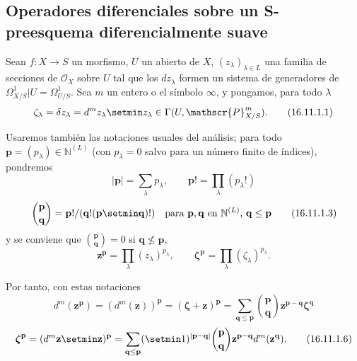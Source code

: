 \subsection{Operadores diferenciales sobre un S-preesquema diferencialmente suave}
\label{IV.16.11}

\begin{env}[16.11.1]
\label{IV.16.11.1}
Sean $f:X\to S$ un morfismo, $U$ un abierto de $X$,
$(z_\lambda)_{\lambda\in L}$ una familia de secciones de $\mathcal{O}_X$
sobre $U$ tal que los $dz_\lambda$ formen un sistema de generadores
de $\varOmega_{X/S}^1|U=\varOmega_{U/S}^1$. Sea $m$ un entero o el símbolo
$\infty$, y pongamos, para todo $\lambda$
\[
  \zeta_\lambda=\delta z_\lambda=d^m z_\lambda\setmin z_\lambda
  \in\Gamma(U,\mathscr{P}_{X/S}^m).
  \tag{16.11.1.1}
  \label{IV.16.11.1.1}
\]

Usaremos también las notaciones usuales del análisis; para todo
$\mathbf{p}=(p_\lambda)\in\mathbb{N}^{(L)}$ (con $p_\lambda=0$ salvo para un
número finito de índices), pondremos
\[
  |\mathbf{p}|=\sum_\lambda p_\lambda,
  \qquad \mathbf{p}!=\prod_\lambda(p_\lambda!)
  \tag{16.11.1.2}
  \label{IV.16.11.1.2}
\]
\[
  \binom{\mathbf{p}}{\mathbf{q}}
  =\mathbf{p}!/(\mathbf{q}!(\mathbf{p}\setmin\mathbf{q})!)
  \quad\text{para $\mathbf{p},\mathbf{q}$ en $\mathbb{N}^{(L)}$,
  $\mathbf{q}\leq\mathbf{p}$}
  \tag{16.11.1.3}
  \label{IV.16.11.1.3}
\]
y se conviene que $\binom{\mathbf{p}}{\mathbf{q}}=0$ si
$\mathbf{q}\nleq\mathbf{p}$,
\[
  \mathbf{z}^{\mathbf{p}}=\prod_\lambda(z_\lambda)^{p_\lambda},
  \qquad
  \boldsymbol{\zeta}^{\mathbf{p}}=\prod_\lambda(\zeta_\lambda)^{p_\lambda}.
  \tag{16.11.1.4}
  \label{IV.16.11.1.4}
\]

Por tanto, con estas notaciones
\[
  d^m(\mathbf{z}^{\mathbf{p}})
  =(d^m(\mathbf{z}))^{\mathbf{p}}
  =(\boldsymbol{\zeta}+\mathbf{z})^{\mathbf{p}}
  =\sum_{\mathbf{q}\leq\mathbf{p}}
    \binom{\mathbf{p}}{\mathbf{q}}
    \mathbf{z}^{\mathbf{p}-\mathbf{q}}\boldsymbol{\zeta}^{\mathbf{q}}
  \tag{16.11.1.5}
  \label{IV.16.11.1.5}
\]
\[
  \boldsymbol{\zeta}^{\mathbf{p}}
  =(d^m\mathbf{z}\setmin\mathbf{z})^{\mathbf{p}}
  =\sum_{\mathbf{q}\leq\mathbf{p}}
    (\setmin 1)^{|\mathbf{p}-\mathbf{q}|}
    \binom{\mathbf{p}}{\mathbf{q}}
    \mathbf{z}^{\mathbf{p}-\mathbf{q}}d^m(\mathbf{z}^{\mathbf{q}}).
  \tag{16.11.1.6}
  \label{IV.16.11.1.6}
\]


\end{env}
